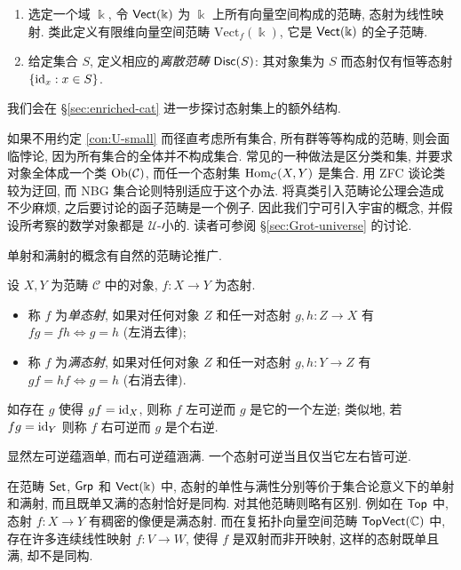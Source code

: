 \begin{example}
\begin{enumerate}
			\[ \Hom(X \times Y, Z) \rightiso \Hom(X, \Hom(Y, Z)). \]
			相关的点集拓扑问题颇为棘手, 为了在确保良好的范畴性质的同时容许充分广的拓扑空间, 在同伦论里一般选用 $\cate{Top}$ 的一个子范畴 $\cate{CGHaus}$, 称为紧生成 Hausdorff 空间范畴; 详见 \cite[Chapter 5]{May99}.
		\item 选定一个域 $\Bbbk$, 令 $\mathsf{Vect}(\Bbbk)$ 为 $\Bbbk$ 上所有向量空间构成的范畴, 态射为线性映射. 类此定义有限维向量空间范畴 $\text{Vect}_f(\Bbbk)$, 它是 $\mathsf{Vect}(\Bbbk)$ 的全子范畴. 
		\item 给定集合 $S$, 定义相应的\emph{离散范畴} $\mathsf{Disc}(S)$: 其对象集为 $S$ 而态射仅有恒等态射 $\{ \mathrm{id}_x : x \in S \}$.
	\end{enumerate}
	我们会在 \S\ref{sec:enriched-cat} 进一步探讨态射集上的额外结构.
\end{example}

\begin{remark}
	如果不用约定 \ref{con:U-small} 而径直考虑所有集合, 所有群等等构成的范畴, 则会面临悖论, 因为所有集合的全体并不构成集合. 常见的一种做法是区分类和集, 并要求对象全体成一个类 $\operatorname{Ob}(\mathcal{C})$, 而任一个态射集 $\operatorname{Hom}_{\mathcal{C}}(X,Y)$ 是集合. 用 ZFC 谈论类较为迂回, 而 NBG 集合论则特别适应于这个办法. 将真类引入范畴论公理会造成不少麻烦, 之后要讨论的函子范畴是一个例子. 因此我们宁可引入宇宙的概念,  并假设所考察的数学对象都是 $\mathcal{U}$-小的. 读者可参阅 \S\ref{sec:Grot-universe} 的讨论.
\end{remark}

单射和满射的概念有自然的范畴论推广.
\begin{definition}
	设 $X, Y$ 为范畴 $\mathcal{C}$ 中的对象, $f: X \to Y$ 为态射.
	\begin{itemize}
		\item 称 $f$ 为\emph{单态射}, 如果对任何对象 $Z$ 和任一对态射 $g, h: Z \to X$ 有 $fg = fh \iff g=h$ (左消去律);
		\item 称 $f$ 为\emph{满态射}, 如果对任何对象 $Z$ 和任一对态射 $g, h: Y \to Z$ 有 $gf = hf \iff g=h$ (右消去律).
	\end{itemize}
	如存在 $g$ 使得 $gf=\mathrm{id}_X$, 则称 $f$ 左可逆而 $g$ 是它的一个左逆; 类似地, 若 $fg = \mathrm{id}_Y$ 则称 $f$ 右可逆而 $g$ 是个右逆.
\end{definition}
显然左可逆蕴涵单, 而右可逆蕴涵满. 一个态射可逆当且仅当它左右皆可逆.

在范畴 $\mathsf{Set}$, $\mathsf{Grp}$ 和 $\mathsf{Vect}(\Bbbk)$ 中, 态射的单性与满性分别等价于集合论意义下的单射和满射, 而且既单又满的态射恰好是同构. 对其他范畴则略有区别. 例如在 $\cate{Top}$ 中, 态射 $f: X \to Y$ 有稠密的像便是满态射. 而在复拓扑向量空间范畴 $\mathsf{TopVect}(\mathbb{C})$ 中, 存在许多连续线性映射 $f: V \to W$, 使得 $f$ 是双射而非开映射, 这样的态射既单且满, 却不是同构.

